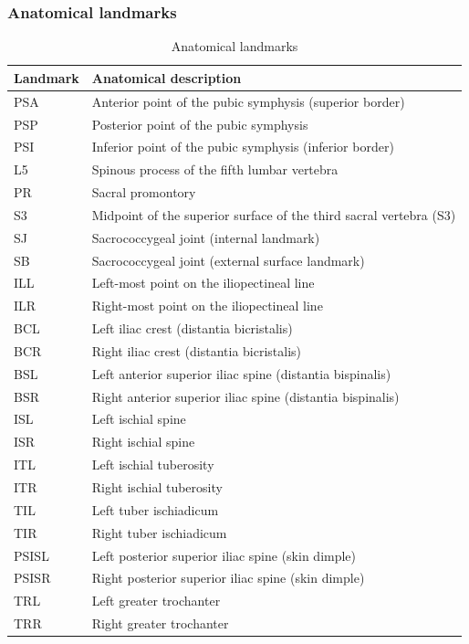 \documentclass[12pt]{article}
\begin{document}
\subsubsection*{Anatomical landmarks}
\begin{table}[h]
\centering\begin{tabular}{|l|l|}
\hline
\textbf{Landmark} & \textbf{Anatomical description} \\
\hline
PSA & Anterior point of the pubic symphysis (superior border) \\
PSP & Posterior point of the pubic symphysis \\
PSI & Inferior point of the pubic symphysis (inferior border) \\
L5 & Spinous process of the fifth lumbar vertebra \\
PR & Sacral promontory \\
S3 & Midpoint of the superior surface of the third sacral vertebra (S3) \\
SJ & Sacrococcygeal joint (internal landmark) \\
SB & Sacrococcygeal joint (external surface landmark) \\
ILL & Left-most point on the iliopectineal line \\
ILR & Right-most point on the iliopectineal line \\
BCL & Left iliac crest (distantia bicristalis) \\
BCR & Right iliac crest (distantia bicristalis) \\
BSL & Left anterior superior iliac spine (distantia bispinalis) \\
BSR & Right anterior superior iliac spine (distantia bispinalis) \\
ISL & Left ischial spine \\
ISR & Right ischial spine \\
ITL & Left ischial tuberosity \\
ITR & Right ischial tuberosity \\
TIL & Left tuber ischiadicum \\
TIR & Right tuber ischiadicum \\
PSISL & Left posterior superior iliac spine (skin dimple) \\
PSISR & Right posterior superior iliac spine (skin dimple) \\
TRL & Left greater trochanter \\
TRR & Right greater trochanter \\
\hline
\end{tabular}
\caption{Anatomical landmarks}\label{tab:landmarks}
\end{table}
\end{document}
